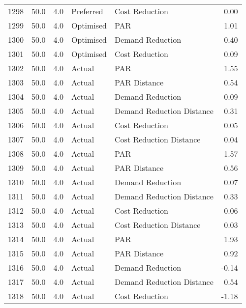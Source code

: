 \begin{longtable}{lrrllr}
1298 &         50.0 &     4.0 &      Preferred &             Cost Reduction &   0.00 \\
1299 &         50.0 &     4.0 &      Optimised &                        PAR &   1.01 \\
1300 &         50.0 &     4.0 &      Optimised &           Demand Reduction &   0.40 \\
1301 &         50.0 &     4.0 &      Optimised &             Cost Reduction &   0.09 \\
1302 &         50.0 &     4.0 &         Actual &                        PAR &   1.55 \\
1303 &         50.0 &     4.0 &         Actual &               PAR Distance &   0.54 \\
1304 &         50.0 &     4.0 &         Actual &           Demand Reduction &   0.09 \\
1305 &         50.0 &     4.0 &         Actual &  Demand Reduction Distance &   0.31 \\
1306 &         50.0 &     4.0 &         Actual &             Cost Reduction &   0.05 \\
1307 &         50.0 &     4.0 &         Actual &    Cost Reduction Distance &   0.04 \\
1308 &         50.0 &     4.0 &         Actual &                        PAR &   1.57 \\
1309 &         50.0 &     4.0 &         Actual &               PAR Distance &   0.56 \\
1310 &         50.0 &     4.0 &         Actual &           Demand Reduction &   0.07 \\
1311 &         50.0 &     4.0 &         Actual &  Demand Reduction Distance &   0.33 \\
1312 &         50.0 &     4.0 &         Actual &             Cost Reduction &   0.06 \\
1313 &         50.0 &     4.0 &         Actual &    Cost Reduction Distance &   0.03 \\
1314 &         50.0 &     4.0 &         Actual &                        PAR &   1.93 \\
1315 &         50.0 &     4.0 &         Actual &               PAR Distance &   0.92 \\
1316 &         50.0 &     4.0 &         Actual &           Demand Reduction &  -0.14 \\
1317 &         50.0 &     4.0 &         Actual &  Demand Reduction Distance &   0.54 \\
1318 &         50.0 &     4.0 &         Actual &             Cost Reduction &  -1.18 \\

\end{longtable}
